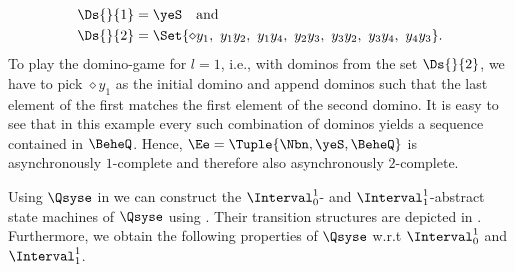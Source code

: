   \begin{align*}
  \Ds{}{1}&=\yeS\quad\text{and}\quad\\
  \Ds{}{2}&=\Set{\diamond y_1,~y_1y_2,~y_1y_4,~y_2y_3,~y_3y_2,~y_3y_4,~y_4y_3}.\end{align*}
  To play the domino-game for $l=1$, i.e., with dominos from the set $\Ds{}{2}$, we have to pick $\diamond y_1$ as the initial domino and append dominos such that the last element of the first matches the first element of the second domino. It is easy to see that in this example every such combination of dominos yields a sequence contained in $\BeheQ$. Hence, $\Ee=\Tuple{\Nbn,\yeS,\BeheQ}$ is asynchronously $1$-complete and therefore also asynchronously $2$-complete.
  


Using $\Qsyse$ in  we can construct the $\Interval^1_0$- and  $\Interval^1_1$-abstract state machines of $\Qsyse$ using . Their transition structures are depicted in . Furthermore, we obtain the following properties of $\Qsyse$ w.r.t $\Interval^1_0$ and $\Interval^1_1$.


